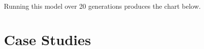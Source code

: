 Running this model over 20 generations produces the chart below.








\section{Case Studies}
\label{cases}
%
